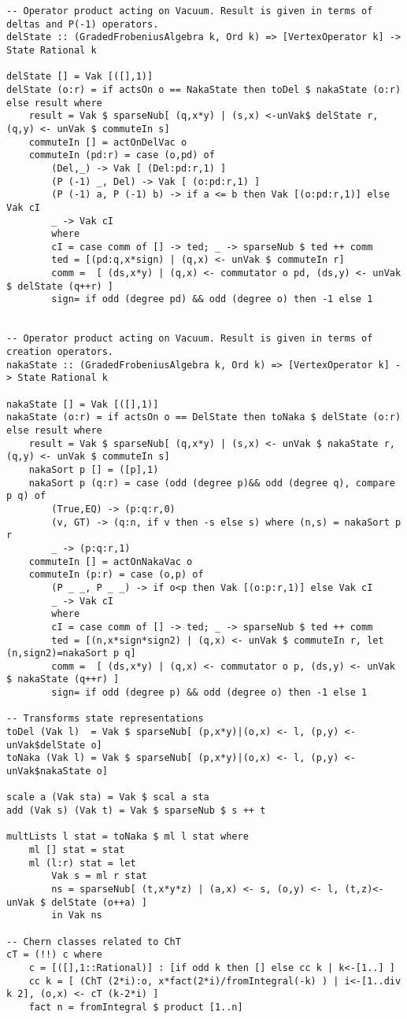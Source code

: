 \begin{lstlisting}
-- Operator product acting on Vacuum. Result is given in terms of deltas and P(-1) operators.
delState :: (GradedFrobeniusAlgebra k, Ord k) => [VertexOperator k] -> State Rational k

delState [] = Vak [([],1)] 
delState (o:r) = if actsOn o == NakaState then toDel $ nakaState (o:r) else result where
	result = Vak $ sparseNub[ (q,x*y) | (s,x) <-unVak$ delState r, (q,y) <- unVak $ commuteIn s]
	commuteIn [] = actOnDelVac o
	commuteIn (pd:r) = case (o,pd) of 
		(Del,_) -> Vak [ (Del:pd:r,1) ]
		(P (-1) _, Del) -> Vak [ (o:pd:r,1) ]
		(P (-1) a, P (-1) b) -> if a <= b then Vak [(o:pd:r,1)] else Vak cI
		_ -> Vak cI
		where
		cI = case comm of [] -> ted; _ -> sparseNub $ ted ++ comm
		ted = [(pd:q,x*sign) | (q,x) <- unVak $ commuteIn r]
		comm =  [ (ds,x*y) | (q,x) <- commutator o pd, (ds,y) <- unVak $ delState (q++r) ]
		sign= if odd (degree pd) && odd (degree o) then -1 else 1


-- Operator product acting on Vacuum. Result is given in terms of creation operators.
nakaState :: (GradedFrobeniusAlgebra k, Ord k) => [VertexOperator k] -> State Rational k

nakaState [] = Vak [([],1)]
nakaState (o:r) = if actsOn o == DelState then toNaka $ delState (o:r) else result where
	result = Vak $ sparseNub[ (q,x*y) | (s,x) <- unVak $ nakaState r, (q,y) <- unVak $ commuteIn s]
	nakaSort p [] = ([p],1)
	nakaSort p (q:r) = case (odd (degree p)&& odd (degree q), compare p q) of
		(True,EQ) -> (p:q:r,0)
		(v, GT) -> (q:n, if v then -s else s) where (n,s) = nakaSort p r
		_ -> (p:q:r,1) 		
	commuteIn [] = actOnNakaVac o
	commuteIn (p:r) = case (o,p) of
		(P _ _, P _ _) -> if o<p then Vak [(o:p:r,1)] else Vak cI 
		_ -> Vak cI
		where
		cI = case comm of [] -> ted; _ -> sparseNub $ ted ++ comm
		ted = [(n,x*sign*sign2) | (q,x) <- unVak $ commuteIn r, let (n,sign2)=nakaSort p q]
		comm =  [ (ds,x*y) | (q,x) <- commutator o p, (ds,y) <- unVak $ nakaState (q++r) ]
		sign= if odd (degree p) && odd (degree o) then -1 else 1

-- Transforms state representations
toDel (Vak l)  = Vak $ sparseNub[ (p,x*y)|(o,x) <- l, (p,y) <- unVak$delState o] 
toNaka (Vak l) = Vak $ sparseNub[ (p,x*y)|(o,x) <- l, (p,y) <- unVak$nakaState o] 

scale a (Vak sta) = Vak $ scal a sta
add (Vak s) (Vak t) = Vak $ sparseNub $ s ++ t

multLists l stat = toNaka $ ml l stat where
	ml [] stat = stat
	ml (l:r) stat = let 
		Vak s = ml r stat
		ns = sparseNub[ (t,x*y*z) | (a,x) <- s, (o,y) <- l, (t,z)<- unVak $ delState (o++a) ]
		in Vak ns

-- Chern classes related to ChT
cT = (!!) c where
	c = [([],1::Rational)] : [if odd k then [] else cc k | k<-[1..] ]
	cc k = [ (ChT (2*i):o, x*fact(2*i)/fromIntegral(-k) ) | i<-[1..div k 2], (o,x) <- cT (k-2*i) ]
	fact n = fromIntegral $ product [1..n]

\end{lstlisting}